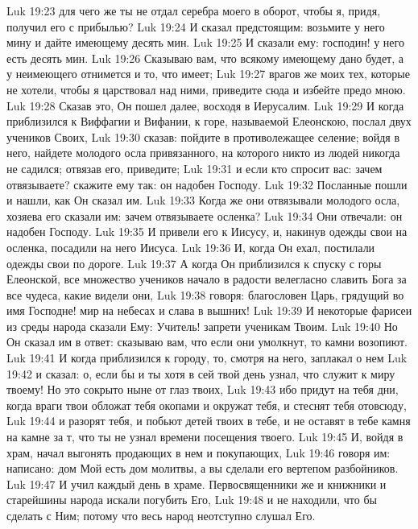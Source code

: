 \vs Luk 19:23 для чего же ты не отдал серебра моего в оборот, чтобы я, придя, получил его с прибылью?
\vs Luk 19:24 И сказал предстоящим: возьмите у него мину и дайте имеющему десять мин.
\vs Luk 19:25 И сказали ему: господин! у него есть десять мин.
\vs Luk 19:26 Сказываю вам, что всякому имеющему дано будет, а у неимеющего отнимется и то, что имеет;
\vs Luk 19:27 врагов же моих тех, которые не хотели, чтобы я царствовал над ними, приведите сюда и избейте предо мною.
\vs Luk 19:28 Сказав это, Он пошел далее, восходя в Иерусалим.
\rsbpar\vs Luk 19:29 И когда приблизился к Виффагии и Вифании, к горе, называемой Елеонскою, послал двух учеников Своих,
\vs Luk 19:30 сказав: пойдите в противолежащее селение; войдя в него, найдете молодого осла привязанного, на которого никто из людей никогда не садился; отвязав его, приведите;
\vs Luk 19:31 и если кто спросит вас: зачем отвязываете? скажите ему так: он надобен Господу.
\vs Luk 19:32 Посланные пошли и нашли, как Он сказал им.
\vs Luk 19:33 Когда же они отвязывали молодого осла, хозяева его сказали им: зачем отвязываете осленка?
\vs Luk 19:34 Они отвечали: он надобен Господу.
\vs Luk 19:35 И привели его к Иисусу, и, накинув одежды свои на осленка, посадили на него Иисуса.
\vs Luk 19:36 И, когда Он ехал, постилали одежды свои по дороге.
\vs Luk 19:37 А когда Он приблизился к спуску с горы Елеонской, все множество учеников начало в радости велегласно славить Бога за все чудеса, какие видели они,
\vs Luk 19:38 говоря: благословен Царь, грядущий во имя Господне! мир на небесах и слава в вышних!
\vs Luk 19:39 И некоторые фарисеи из среды народа сказали Ему: Учитель! запрети ученикам Твоим.
\vs Luk 19:40 Но Он сказал им в ответ: сказываю вам, что если они умолкнут, то камни возопиют.
\vs Luk 19:41 И когда приблизился к городу, то, смотря на него, заплакал о нем
\vs Luk 19:42 и сказал: о, если бы и ты хотя в сей твой день узнал, что служит к миру твоему! Но это сокрыто ныне от глаз твоих,
\vs Luk 19:43 ибо придут на тебя дни, когда враги твои обложат тебя окопами и окружат тебя, и стеснят тебя отовсюду,
\vs Luk 19:44 и разорят тебя, и побьют детей твоих в тебе, и не оставят в тебе камня на камне за т, что ты не узнал времени посещения твоего.
\vs Luk 19:45 И, войдя в храм, начал выгонять продающих в нем и покупающих,
\vs Luk 19:46 говоря им: написано: дом Мой есть дом молитвы, а вы сделали его вертепом разбойников.
\vs Luk 19:47 И учил каждый день в храме. Первосвященники же и книжники и старейшины народа искали погубить Его,
\vs Luk 19:48 и не находили, что бы сделать с Ним; потому что весь народ неотступно слушал Его.
